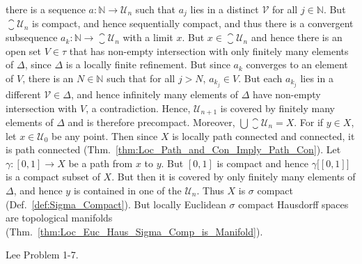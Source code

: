 \begin{solution}
            there is a sequence $a:\mathbb{N}\rightarrow\mathcal{U}_{n}$ such
            that $a_{j}$ lies in a distinct $\mathcal{V}$ for all
            $j\in\mathbb{N}$. But $\closure{\mathcal{U}_{n}}$ is compact, and
            hence sequentially compact, and thus there is a convergent
            subsequence $a_{k}:\mathbb{N}\rightarrow\closure{\mathcal{U}_{n}}$
            with a limit $x$. But $x\in\closure{\mathcal{U}_{n}}$ and hence
            there is an open set $V\in\tau$ that has non-empty intersection with
            only finitely many elements of $\Delta$, since $\Delta$ is a locally
            finite refinement. But since $a_{k}$ converges to an element of $V$,
            there is an $N\in\mathbb{N}$ such that for all $j>N$,
            $a_{k_{j}}\in{V}$. But each $a_{k_{j}}$ lies in a different
            $\mathcal{V}\in\Delta$, and hence infinitely many elements of
            $\Delta$ have non-empty intersection with $V$, a contradiction.
            Hence, $\mathcal{U}_{n+1}$ is covered by finitely many elements of
            $\Delta$ and is therefore precompact. Moreover,
            $\bigcup\closure{\mathcal{U}_{n}}=X$. For if $y\in{X}$, let
            $x\in\mathcal{U}_{0}$ be any point. Then since $X$ is locally path
            connected and connected, it is path connected
            (Thm.~\ref{thm:Loc_Path_and_Con_Imply_Path_Con}).
            Let $\gamma:[0,1]\rightarrow{X}$ be a path from $x$ to $y$. But
            $[0,1]$ is compact and hence $\gamma\big[[0,1]\big]$ is a compact
            subset of $X$. But then it is covered by only finitely many elements
            of $\Delta$, and hence $y$ is contained in one of the
            $\mathcal{U}_{n}$. Thus $X$ is $\sigma$ compact
            (Def.~\ref{def:Sigma_Compact}). But locally Euclidean $\sigma$
            compact Hausdorff spaces are topological manifolds
            (Thm.~\ref{thm:Loc_Euc_Haus_Sigma_Comp_is_Manifold}).
        \end{solution}
        \begin{problem}
            Lee Problem 1-7.
        \end{problem}
